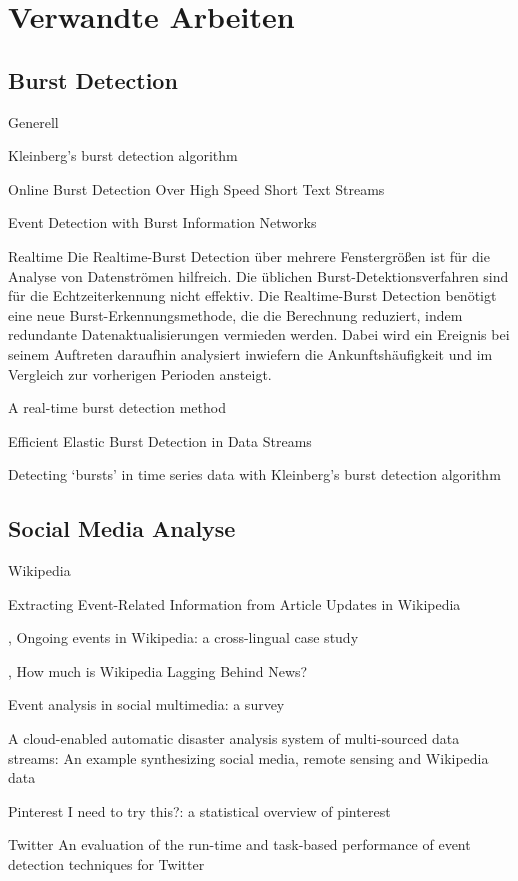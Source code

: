 \section{Verwandte Arbeiten}
\subsection{Burst Detection}
Generell

Kleinberg’s burst detection algorithm

Online Burst Detection Over High Speed Short Text Streams
\cite{yuan2007online}


Event Detection with Burst Information Networks
\cite{ge2016event}

Realtime
Die Realtime-Burst Detection über mehrere Fenstergrößen ist für die Analyse von Datenströmen hilfreich. Die üblichen Burst-Detektionsverfahren sind für die Echtzeiterkennung nicht effektiv. Die Realtime-Burst Detection benötigt eine neue Burst-Erkennungsmethode, die die Berechnung reduziert, indem redundante Datenaktualisierungen vermieden werden. Dabei wird ein Ereignis bei seinem Auftreten daraufhin analysiert inwiefern die Ankunftshäufigkeit und im Vergleich zur vorherigen Perioden ansteigt.

\cite{ebina2011real}
A real-time burst detection method

Efficient Elastic Burst Detection in Data Streams 


Detecting ‘bursts’ in time series data with Kleinberg’s burst detection algorithm
\cite{kleinberg1}

\subsection{Social Media Analyse}

Wikipedia

Extracting Event-Related Information from
Article Updates in Wikipedia
\cite{10.1007978-3-642-36973-5_22}


\cite{gottschalk2017ongoing},
  Ongoing events in Wikipedia: a cross-lingual case study

\cite{fetahu2015much},
  How much is Wikipedia Lagging Behind News?

\cite{liu2016event}
  Event analysis in social multimedia: a survey

A cloud-enabled automatic disaster analysis system of multi-sourced data streams: An example synthesizing social media, remote sensing and Wikipedia data
\cite{huang2017cloud}

Pinterest
I need to try this?: a statistical overview of pinterest
\cite{gilbert2013need}

Twitter
An evaluation of the run-time and task-based performance of event detection techniques for Twitter
\cite{weiler2016evaluation}
